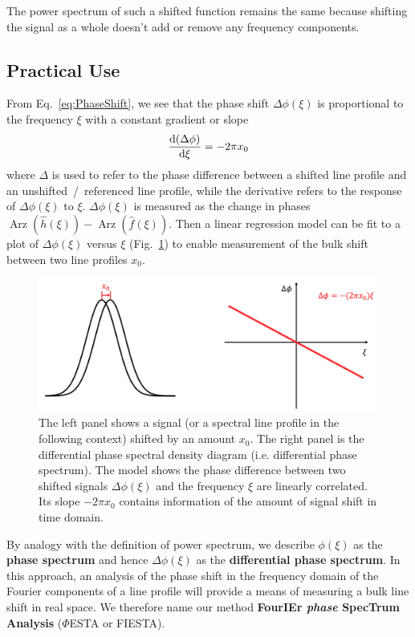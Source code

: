 The power spectrum of such a shifted function remains the same because shifting the signal as a whole doesn't add or remove any frequency components. 


\subsection{Practical Use}

From Eq.~\ref{eq:PhaseShift}, we see that the phase shift $\Delta \phi(\xi)$ is proportional to the frequency $\xi$ with a constant gradient or slope
\begin{equation}
	\dv{(\Delta \phi)}{\xi} = -2 \pi x_0
\label{eq:gradient}
\end{equation}
where $\Delta$ is used to refer to the phase difference between a shifted line profile and an unshifted~/~referenced line profile, while the derivative refers to the response of $\Delta \phi(\xi)$ to $\xi$. $\Delta \phi(\xi)$ is measured as the change in phases $\operatorname{Arz}(\hat{h}(\xi)) - \operatorname{Arz}(\hat{f}(\xi))$. Then a linear regression model can be fit to a plot of $\Delta \phi(\xi)$ versus $\xi$ (Fig.~\ref{fig:FT}) to enable measurement of the bulk shift between two line profiles $x_0$. 

\begin{figure}[tbp]
\centering
\includegraphics[width = 0.99 \linewidth]
{./Figures/Methods/FT.png}
\caption[Translation property of Fourier transform]
{The left panel shows a signal (or a spectral line profile in the following context) shifted by an amount $x_0$. 
The right panel is the differential phase spectral density diagram (i.e. differential phase spectrum). 
The model shows the phase difference between two shifted signals $\Delta \phi(\xi)$ and the frequency $\xi$ are linearly correlated. Its slope $-2 \pi x_0$ contains information of the amount of signal shift in time domain.}
\label{fig:FT}
\end{figure} 

By analogy with the definition of power spectrum, we describe $\phi(\xi)$ as the \textbf{phase spectrum} and hence $\Delta \phi(\xi)$ as the \textbf{differential phase spectrum}. In this approach, an analysis of the phase shift in the frequency domain of the Fourier components of a line profile will provide a means of measuring a bulk line shift in real space. We therefore name our method \textbf{FourIEr \textit{phase} SpecTrum Analysis} ($\mathit{\Phi}$ESTA or FIESTA). 

